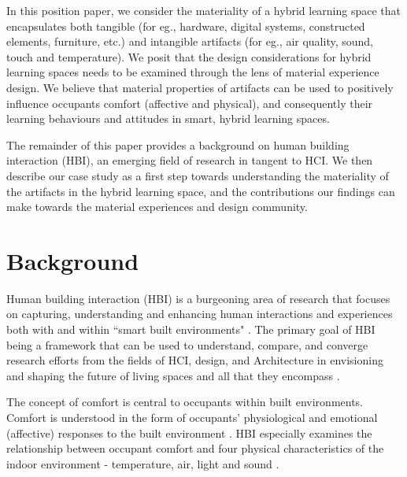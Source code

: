 \documentclass[acmconf, anonymous, review]{acmart}
\begin{document}
In this position paper, we consider the materiality of a hybrid learning space that encapsulates both tangible (for eg., hardware, digital systems, constructed elements, furniture, etc.) and intangible artifacts (for eg., air quality, sound, touch and temperature). We posit that the design considerations for hybrid learning spaces needs to be examined through the lens of material experience design. We believe that material properties of artifacts can be used to positively influence occupants comfort (affective and physical), and consequently their learning behaviours and attitudes in smart, hybrid learning spaces.


The remainder of this paper provides a background on human building interaction (HBI), an emerging field of research in tangent to HCI. We then describe our case study as a first step towards understanding the materiality of the artifacts in the hybrid learning space, and the contributions our findings can make towards the material experiences and design community. 


\section{Background}
Human building interaction (HBI) is a burgeoning area of research that focuses on capturing, understanding and enhancing human interactions and experiences both with and within ``smart built environments" \cite{alavi2016future}. The primary goal of HBI being a framework that can be used to understand, compare, and converge research efforts from the fields of HCI, design, and Architecture in envisioning and shaping the future of living spaces and all that they encompass \cite{nembrini2017human, alavi2018artifacts}. 

The concept of comfort is central to occupants within built environments. Comfort is understood in the form of occupants' physiological and emotional (affective) responses to the built environment \cite{alavi2017comfort}. HBI especially examines the relationship between occupant comfort and four physical characteristics of the indoor environment - temperature, air, light and sound \cite{hawkes2007environmental, bluyssen2009indoor}. 
\end{document}
